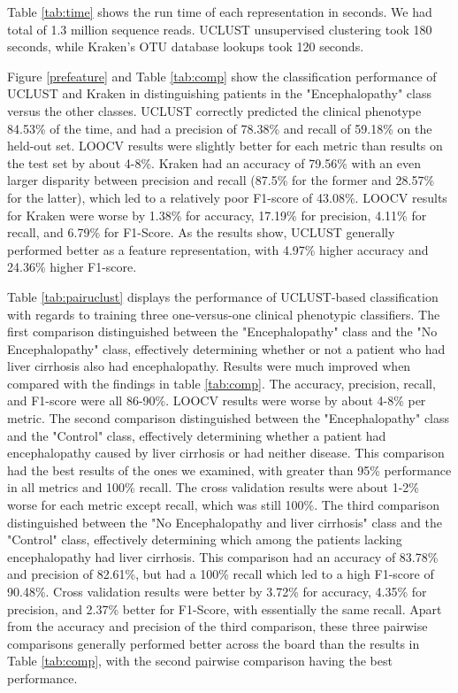Table \ref{tab:time} shows 
the run time of each representation in seconds. We had total of 1.3 million sequence reads. UCLUST unsupervised clustering 
took 180 seconds, while Kraken's OTU database lookups took 120 seconds.

Figure \ref{prefeature} and Table \ref{tab:comp} show 
the classification performance of UCLUST and 
Kraken in distinguishing patients in the "Encephalopathy" class versus 
the other classes. UCLUST correctly predicted the clinical 
phenotype 84.53\% of the time, and had a precision of 78.38\% and recall of 59.18\% on the held-out set. LOOCV results were 
slightly better for each metric than results on the test 
set by about 4-8\%. Kraken had an accuracy of 79.56\% with an even 
larger disparity between precision and recall (87.5\% for the former and 
28.57\% for the latter), which led to a relatively poor F1-score of 43.08\%. LOOCV results for Kraken 
were worse by 1.38\% for accuracy, 17.19\% for precision, 4.11\% for recall, and 6.79\% for F1-Score. As 
the results show, UCLUST generally performed better as a feature 
representation, with 4.97\% higher accuracy and 24.36\% higher F1-score.

Table \ref{tab:pairuclust} displays the performance of UCLUST-based classification 
with regards to training three one-versus-one clinical phenotypic classifiers.  The first comparison 
distinguished between the "Encephalopathy" class and the "No Encephalopathy" class, effectively determining whether or not a patient who had liver cirrhosis also had encephalopathy. Results were much improved when compared with the findings in table \ref{tab:comp}. The accuracy, precision, recall, and F1-score were all  86-90\%. LOOCV
results were worse by about 4-8\% per metric. The 
second comparison distinguished between the "Encephalopathy" class and 
the "Control" class, effectively determining whether a 
patient had encephalopathy caused by liver cirrhosis or had neither disease. This comparison had the best results of the ones we examined, with greater than 95\% performance in all metrics and 100\% recall. The cross validation
results were about 1-2\% worse for each metric except recall, which was still 100\%. The 
third comparison distinguished between the "No Encephalopathy and liver cirrhosis" class and the "Control" class, effectively determining which among the patients lacking encephalopathy had liver cirrhosis. This comparison had an accuracy of 83.78\% and precision of 82.61\%, but had a 100\% recall which led to a high F1-score of 90.48\%. Cross validation results were better by 3.72\% for accuracy, 4.35\% for precision, and 2.37\% better for F1-Score, with essentially the same recall.  Apart from the accuracy and precision of the third comparison, these three pairwise comparisons generally performed better across the board than the results in Table \ref{tab:comp}, with the second pairwise comparison having the best performance.

